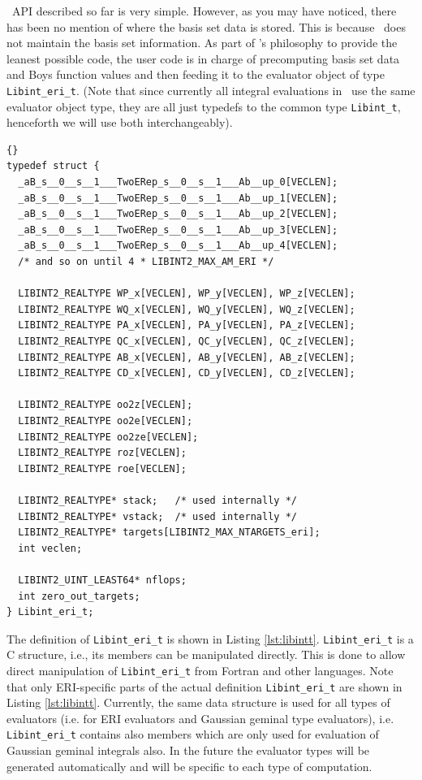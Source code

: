 \documentclass[10pt]{article}
\begin{document}
\LIBINT\ API described so far is very simple. However, as you may have noticed, there has been no mention of
where the basis set data is stored. This is because \LIBINT\ does not maintain the basis set information.
As part of \LIBINT 's philosophy to provide the leanest possible code, the user code
is in charge of precomputing basis set data and Boys function values and then feeding it to the evaluator object
of type {\tt Libint\_eri\_t}. (Note that since currently all integral evaluations in \LIBINT\ use the same
evaluator object type, they are all just typedefs to the common type {\tt Libint\_t}, henceforth
we will use both interchangeably).

\begin{lstlisting}[label=lst:libintt,caption=Definition of the \LIBINT\ integral evaluator type.]{}
typedef struct {
  _aB_s__0__s__1___TwoERep_s__0__s__1___Ab__up_0[VECLEN];
  _aB_s__0__s__1___TwoERep_s__0__s__1___Ab__up_1[VECLEN];
  _aB_s__0__s__1___TwoERep_s__0__s__1___Ab__up_2[VECLEN];
  _aB_s__0__s__1___TwoERep_s__0__s__1___Ab__up_3[VECLEN];
  _aB_s__0__s__1___TwoERep_s__0__s__1___Ab__up_4[VECLEN];
  /* and so on until 4 * LIBINT2_MAX_AM_ERI */

  LIBINT2_REALTYPE WP_x[VECLEN], WP_y[VECLEN], WP_z[VECLEN];
  LIBINT2_REALTYPE WQ_x[VECLEN], WQ_y[VECLEN], WQ_z[VECLEN];
  LIBINT2_REALTYPE PA_x[VECLEN], PA_y[VECLEN], PA_z[VECLEN];
  LIBINT2_REALTYPE QC_x[VECLEN], QC_y[VECLEN], QC_z[VECLEN];
  LIBINT2_REALTYPE AB_x[VECLEN], AB_y[VECLEN], AB_z[VECLEN];
  LIBINT2_REALTYPE CD_x[VECLEN], CD_y[VECLEN], CD_z[VECLEN];

  LIBINT2_REALTYPE oo2z[VECLEN];
  LIBINT2_REALTYPE oo2e[VECLEN];
  LIBINT2_REALTYPE oo2ze[VECLEN];
  LIBINT2_REALTYPE roz[VECLEN];
  LIBINT2_REALTYPE roe[VECLEN];
  
  LIBINT2_REALTYPE* stack;   /* used internally */
  LIBINT2_REALTYPE* vstack;  /* used internally */
  LIBINT2_REALTYPE* targets[LIBINT2_MAX_NTARGETS_eri];
  int veclen;

  LIBINT2_UINT_LEAST64* nflops;
  int zero_out_targets;
} Libint_eri_t;
\end{lstlisting}

The definition of {\tt Libint\_eri\_t} is shown in Listing \ref{lst:libintt}.
{\tt Libint\_eri\_t} is a C structure, i.e., its members can be manipulated directly.
This is done to allow direct manipulation of {\tt Libint\_eri\_t} from
Fortran and other languages.
Note that only ERI-specific parts of the actual definition {\tt Libint\_eri\_t}
are shown in Listing \ref{lst:libintt}. Currently, the same data structure is
used for all types of evaluators (i.e. for ERI evaluators and Gaussian geminal type evaluators), i.e. {\tt Libint\_eri\_t} contains also members which are only used
for evaluation of Gaussian geminal integrals also. In the future the evaluator types will be generated
automatically and will be specific to each type of computation.
\end{document}
